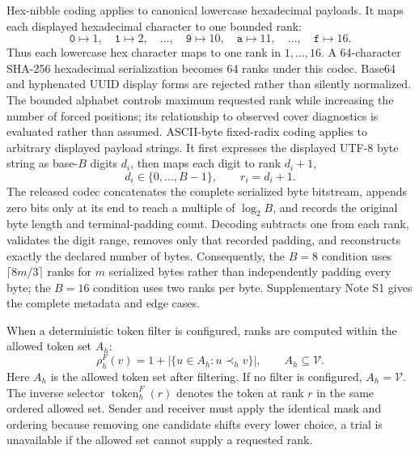 \documentclass[fleqn,10pt]{wlscirep}
\begin{document}
Hex-nibble coding applies to canonical lowercase hexadecimal payloads. It maps each displayed hexadecimal character to one bounded rank:
\begin{equation}
\texttt{0}\mapsto 1,\quad
\texttt{1}\mapsto 2,\quad
\ldots,\quad
\texttt{9}\mapsto 10,\quad
\texttt{a}\mapsto 11,\quad
\ldots,\quad
\texttt{f}\mapsto 16.
\label{eq:hex-nibble-map}
\end{equation}
Thus each lowercase hex character maps to one rank in \(1,\ldots,16\). A 64-character SHA-256 hexadecimal serialization becomes 64 ranks under this codec. Base64 and hyphenated UUID display forms are rejected rather than silently normalized. The bounded alphabet controls maximum requested rank while increasing the number of forced positions; its relationship to observed cover diagnostics is evaluated rather than assumed.
ASCII-byte fixed-radix coding applies to arbitrary displayed payload strings. It first expresses the displayed UTF-8 byte string as base-\(B\) digits \(d_i\), then maps each digit to rank \(d_i+1\),
\begin{equation}
d_i\in\{0,\ldots,B-1\},
\qquad
r_i=d_i+1.
\label{eq:ascii-radix-map}
\end{equation}
The released codec concatenates the complete serialized byte bitstream, appends zero bits only at its end to reach a multiple of \(\log_2B\), and records the original byte length and terminal-padding count. Decoding subtracts one from each rank, validates the digit range, removes only that recorded padding, and reconstructs exactly the declared number of bytes. Consequently, the \(B=8\) condition uses \(\lceil8m/3\rceil\) ranks for \(m\) serialized bytes rather than independently padding every byte; the \(B=16\) condition uses two ranks per byte. Supplementary Note S1 gives the complete metadata and edge cases.

When a deterministic token filter is configured, ranks are computed within the allowed token set \(A_h\):
\begin{equation}
\rho^F_h(v)=1+\left|\{u\in A_h:u\prec_h v\}\right|,
\qquad
A_h\subseteq\mathcal V.
\label{eq:filtered-rank}
\end{equation}
Here \(A_h\) is the allowed token set after filtering. If no filter is configured, \(A_h=\mathcal V\). The inverse selector \(\operatorname{token}_h^F(r)\) denotes the token at rank \(r\) in the same ordered allowed set. Sender and receiver must apply the identical mask and ordering because removing one candidate shifts every lower choice, a trial is unavailable if the allowed set cannot supply a requested rank.
\end{document}
